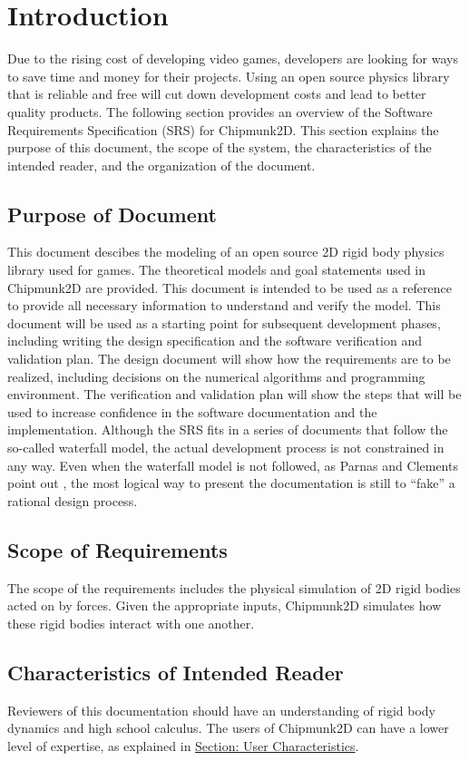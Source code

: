 \documentclass[12pt]{article}
\begin{document}
\section{Introduction}
\label{Sec:Intro}
Due to the rising cost of developing video games, developers are looking for ways to save time and money for their projects. Using an open source physics library that is reliable and free will cut down development costs and lead to better quality products.
The following section provides an overview of the Software Requirements Specification (SRS) for Chipmunk2D. This section explains the purpose of this document, the scope of the system, the characteristics of the intended reader, and the organization of the document.
\subsection{Purpose of Document}
\label{Sec:DocPurpose}
This document descibes the modeling of an open source 2D rigid body physics library used for games. The theoretical models and goal statements used in Chipmunk2D are provided. This document is intended to be used as a reference to provide all necessary information to understand and verify the model.
This document will be used as a starting point for subsequent development phases, including writing the design specification and the software verification and validation plan. The design document will show how the requirements are to be realized, including decisions on the numerical algorithms and programming environment. The verification and validation plan will show the steps that will be used to increase confidence in the software documentation and the implementation. Although the SRS fits in a series of documents that follow the so-called waterfall model, the actual development process is not constrained in any way. Even when the waterfall model is not followed, as Parnas and Clements point out \cite{parnasClements1986}, the most logical way to present the documentation is still to ``fake'' a rational design process.
\subsection{Scope of Requirements}
\label{Sec:ReqsScope}
The scope of the requirements includes the physical simulation of 2D rigid bodies acted on by forces. Given the appropriate inputs, Chipmunk2D simulates how these rigid bodies interact with one another.
\subsection{Characteristics of Intended Reader}
\label{Sec:ReaderChars}
Reviewers of this documentation should have an understanding of rigid body dynamics and high school calculus. The users of Chipmunk2D can have a lower level of expertise, as explained in \hyperref[Sec:UserChars]{Section: User Characteristics}.
\end{document}
